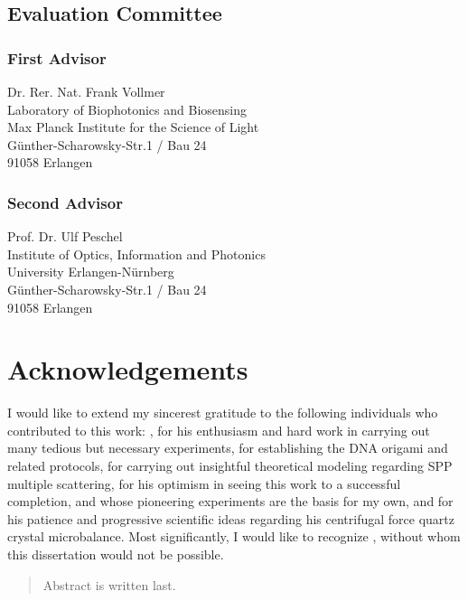\section*{Evaluation Committee}
\subsection*{First Advisor}
Dr. Rer. Nat. Frank Vollmer\\
Laboratory of Biophotonics and Biosensing\\
Max Planck Institute for the Science of Light\\
G\"unther-Scharowsky-Str.1 / Bau 24\\
91058 Erlangen
\subsection*{Second Advisor}
Prof. Dr. Ulf Peschel\\
Institute of Optics, Information and Photonics\\
University Erlangen-N\"urnberg\\
G\"unther-Scharowsky-Str.1 / Bau 24\\
91058 Erlangen

\newpage
\chapter*{Acknowledgements}
I would like to extend my sincerest gratitude to the following individuals
who contributed to this work: , for his enthusiasm
and hard work in carrying out many tedious but necessary experiments,
 for establishing the DNA origami and related protocols,
 for carrying out insightful theoretical modeling
regarding SPP multiple scattering,  for his optimism
in seeing this work to a successful completion, 
and  whose pioneering experiments are the basis
for my own, and  for his patience and progressive
scientific ideas regarding his centrifugal force quartz crystal
microbalance.  Most significantly, I would like to recognize
, without whom this dissertation would not be
possible.

\tableofcontents

\begin{abstract}
 Abstract is written last.
\end{abstract}

